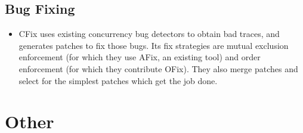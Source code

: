 \documentclass{article}
\begin{document}
\subsection{Bug Fixing}
\begin{itemize}
	\item CFix \cite{cfix} uses existing concurrency bug detectors to obtain bad traces, and generates patches to fix those bugs. Its fix strategies are mutual exclusion enforcement (for which they use AFix, an existing tool) and order enforcement (for which they contribute OFix). They also merge patches and select for the simplest patches which get the job done.
\end{itemize}


\section{Other}


{}

\end{document}
